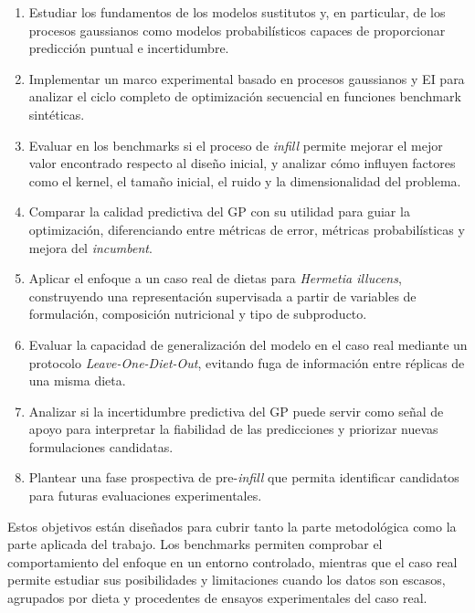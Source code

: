 \begin{enumerate}
    \item Estudiar los fundamentos de los modelos sustitutos y, en particular, de los procesos gaussianos como modelos probabilísticos capaces de proporcionar predicción puntual e incertidumbre.

    \item Implementar un marco experimental basado en procesos gaussianos y EI para analizar el ciclo completo de optimización secuencial en funciones benchmark sintéticas.

    \item Evaluar en los benchmarks si el proceso de \emph{infill} permite mejorar el mejor valor encontrado respecto al diseño inicial, y analizar cómo influyen factores como el kernel, el tamaño inicial, el ruido y la dimensionalidad del problema.

    \item Comparar la calidad predictiva del GP con su utilidad para guiar la optimización, diferenciando entre métricas de error, métricas probabilísticas y mejora del \emph{incumbent}.

    \item Aplicar el enfoque a un caso real de dietas para \textit{Hermetia illucens}, construyendo una representación supervisada a partir de variables de formulación, composición nutricional y tipo de subproducto.

    \item Evaluar la capacidad de generalización del modelo en el caso real mediante un protocolo \emph{Leave-One-Diet-Out}, evitando fuga de información entre réplicas de una misma dieta.

    \item Analizar si la incertidumbre predictiva del GP puede servir como señal de apoyo para interpretar la fiabilidad de las predicciones y priorizar nuevas formulaciones candidatas.

    \item Plantear una fase prospectiva de pre-\emph{infill} que permita identificar candidatos para futuras evaluaciones experimentales.
\end{enumerate}

Estos objetivos están diseñados para cubrir tanto la parte metodológica como la parte aplicada del trabajo. Los benchmarks permiten comprobar el comportamiento del enfoque en un entorno controlado, mientras que el caso real permite estudiar sus posibilidades y limitaciones cuando los datos son escasos, agrupados por dieta y procedentes de ensayos experimentales del caso real.

